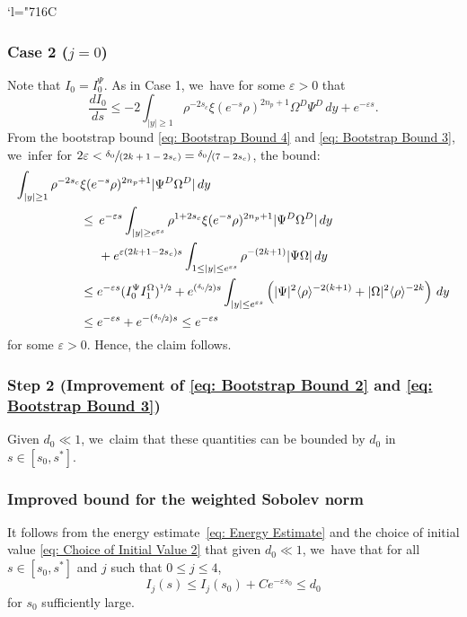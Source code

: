 \documentclass[JEP,XML,SOM,Unicode]{cedram}
\newcommand{\Changelback}{\mathcode`l="716C}
\newcommand{\Psfrac}[2]{(\sfrac{#1}{#2})}
\newcommand{\spfrac}[2]{\sfrac{#1}{(#2)}}
\theoremstyle{plain}
\theoremstyle{definition}
\begin{document}
\Changelback

\subsubsection*{Case 2 ($j=0$)}
Note that $I_0=I_0^\Psi$. As in Case 1, we~have for some $\varepsilon>0$ that
\[
\frac{dI_0}{ds} \le -2\int_{|y|\ge 1} \rho^{-2s_c}\xi(e^{-s}\rho)^{2n_p+1}\Omega^D\Psi^D\,dy+e^{-\varepsilon s}.
\]
From the bootstrap bound \eqref{eq: Bootstrap Bound 4} and \eqref{eq: Bootstrap Bound 3}, we~infer for $2\varepsilon<\spfrac{\delta_0}{2k+1-2s_c}=\spfrac{\delta_0}{7-2s_c}$, the bound:
\[
\begin{aligned}
\int_{|y|\ge1} \rho^{-2s_c}&\xi(e^{-s}\rho)^{2n_p+1}|\Psi^D\Omega^D|\,dy\\
&\le \, e^{-\varepsilon s}\int_{|y|\ge e^{\varepsilon s}} \rho^{1+2s_c}\xi(e^{-s}\rho)^{2n_p+1}| \Psi^D \Omega^D|\,dy\\
&\hspace*{.5cm}+e^{\varepsilon(2k+1-2s_c)s}\int_{1\le|y|\le e^{\varepsilon s}} \rho^{-(2k+1)}|\Psi \Omega|\,dy\\
&\le e^{-\varepsilon s}(I_0^\Psi I_1^\Omega)^{\sfrac{1}{2}}+e^{\Psfrac{\delta_0}{2} s}\int_{|y|\le e^{\varepsilon s}}\left(| \Psi |^2\langle\rho\rangle^{-2(k+1)}+|\Omega |^2\langle\rho\rangle^{-2k}\right)\,dy\\
&\le e^{-\varepsilon s}+e^{-\Psfrac{\delta_0}{2}s}\le e^{-\varepsilon s}
\end{aligned}
\]
for some $\varepsilon>0$. Hence, the claim follows.

\subsubsection*{Step 2 (Improvement of \eqref{eq: Bootstrap Bound 2} and \eqref{eq: Bootstrap Bound 3})}
Given $d_0\ll 1$, we~claim that these quantities can be bounded by $d_0$ in $s\in [s_0,s^*]$.

\subsubsection*{Improved bound for the weighted Sobolev norm}
It follows from the energy estimate~\eqref{eq: Energy Estimate} and the choice of initial value \eqref{eq: Choice of Initial Value 2} that given $d_0\ll1$, we~have that for all $s\in [s_0,s^*]$ and $j$ such that $0\le j\le 4$,
\begin{equation}
\label{eq: Improved Bound 1}
I_j(s)\le I_j(s_0)+ Ce^{-\varepsilon s_0} \le d_0
\end{equation}
for $s_0$ sufficiently large.
\end{document}
